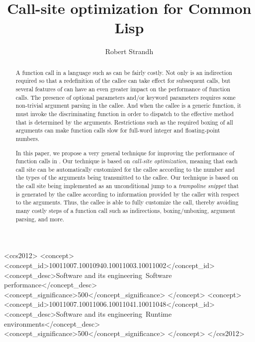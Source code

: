 \documentclass[format=sigconf]{acmart}
\begin{document}
\title{Call-site optimization for Common Lisp}

\author{Robert Strandh}


\begin{abstract}
A function call in a language such as \commonlisp{} can be fairly
costly.  Not only is an indirection required so that a redefinition of
the callee can take effect for subsequent calls, but several features
of \commonlisp{} can have an even greater impact on the performance of
function calls.  The presence of optional parameters and/or keyword
parameters requires some non-trivial argument parsing in the callee.
And when the callee is a generic function, it must invoke the
discriminating function in order to dispatch to the effective
method that is determined by the arguments.  Restrictions such as the
required boxing of all arguments can make function calls slow for
full-word integer and floating-point numbers.

In this paper, we propose a very general technique for improving the
performance of function calls in \commonlisp{}.  Our technique is
based on \emph{call-site optimization}, meaning that each call site
can be automatically customized for the callee according to the number
and the types of the arguments being transmitted to the callee.  Our
technique is based on the call site being implemented as an
unconditional jump to a \emph{trampoline snippet} that is generated by
the callee according to information provided by the caller with
respect to the arguments.  Thus, the callee is able to fully customize
the call, thereby avoiding many costly steps of a function call such
as indirections, boxing/unboxing, argument parsing, and more.
\end{abstract}

\begin{CCSXML}
<ccs2012>
<concept>
<concept_id>10011007.10010940.10011003.10011002</concept_id>
<concept_desc>Software and its engineering~Software performance</concept_desc>
<concept_significance>500</concept_significance>
</concept>
<concept>
<concept_id>10011007.10011006.10011041.10011048</concept_id>
<concept_desc>Software and its engineering~Runtime environments</concept_desc>
<concept_significance>500</concept_significance>
</concept>
</ccs2012>
\end{CCSXML}
\end{document}
